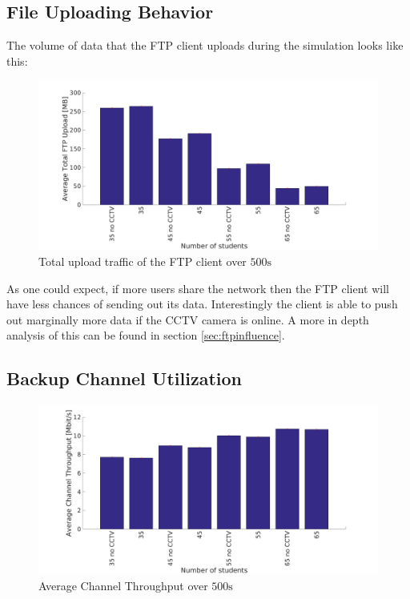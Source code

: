 \documentclass[a4paper]{scrreprt}
\begin{document}
		\subsection{File Uploading Behavior}\label{sec:ftp}		
			The volume of data that the FTP client uploads during the simulation looks like this:
			\begin{figure}[H]
				\center\includegraphics[width=\textwidth]{../Results_Analysis/FTP/ftp.png}
				\caption{Total upload traffic of the FTP client over $500\text{s}$}
				\label{fig:ftp}
			\end{figure}		
			
			As one could expect, if more users share the network then the FTP client will have less chances of sending out its data. Interestingly the client is able to push out marginally more data if the CCTV camera is online. A more in depth analysis of this can be found in section \ref{sec:ftpinfluence}.
			
		\subsection{Backup Channel Utilization}
			\begin{figure}[H]
				\center\includegraphics[width=\textwidth]{../Results_Analysis/ChannelThroughput/channel_throughput.png}
				\caption{Average Channel Throughput over $500\text{s}$}
				\label{fig:channelthroughput}
			\end{figure}	
			
\end{document}

